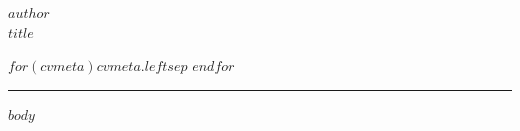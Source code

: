 \documentclass[10pt,A4]{article}
\newcommand{\mystrut}{\rule[-.3\baselineskip]{0pt}{\baselineskip}}
\begin{document}
\pagestyle{fancy}

\vspace{-8pt}
\begin{center}
	\huge $author$\\[6pt]
	\LARGE $title$\\[6pt]
\end{center}
\begin{center}
\large $for(cvmeta)$$cvmeta.left$$sep$ \quad $endfor$
\end{center}
\vspace{-2pt}
\textcolor{softcol}{\hrule}
\vspace{6pt}
\normalsize
\vspace{-6pt}
$body$

\null
\vspace*{\fill}
\hspace{-0.25\linewidth}\colorbox{white}{\makebox[1.5\linewidth][c]{\mystrut  \textnormal{\textcolor{sectcol}{$cvfooter.left$}  *  \textcolor{sectcol}{$cvfooter.right$}}}}
\end{document}
